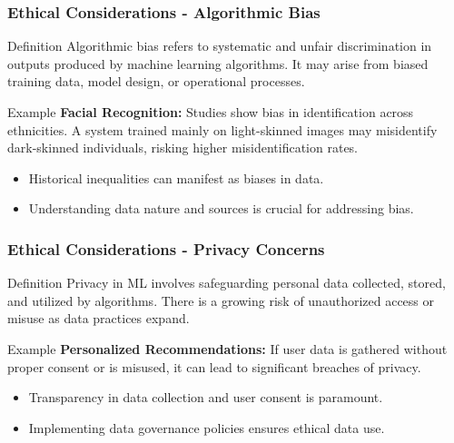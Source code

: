 \documentclass[aspectratio=169]{beamer}
\begin{document}
\begin{frame}[fragile]
    \frametitle{Ethical Considerations - Algorithmic Bias}
    \begin{block}{Definition}
        Algorithmic bias refers to systematic and unfair discrimination in outputs produced by machine learning algorithms. It may arise from biased training data, model design, or operational processes.
    \end{block}
    
    \begin{exampleblock}{Example}
        \textbf{Facial Recognition:} Studies show bias in identification across ethnicities. A system trained mainly on light-skinned images may misidentify dark-skinned individuals, risking higher misidentification rates.
    \end{exampleblock}

    \begin{itemize}
        \item Historical inequalities can manifest as biases in data.
        \item Understanding data nature and sources is crucial for addressing bias.
    \end{itemize}
\end{frame}

\begin{frame}[fragile]
    \frametitle{Ethical Considerations - Privacy Concerns}
    \begin{block}{Definition}
        Privacy in ML involves safeguarding personal data collected, stored, and utilized by algorithms. There is a growing risk of unauthorized access or misuse as data practices expand.
    \end{block}
    
    \begin{exampleblock}{Example}
        \textbf{Personalized Recommendations:} If user data is gathered without proper consent or is misused, it can lead to significant breaches of privacy.
    \end{exampleblock}

    \begin{itemize}
        \item Transparency in data collection and user consent is paramount.
        \item Implementing data governance policies ensures ethical data use.
    \end{itemize}
\end{frame}
\end{document}
